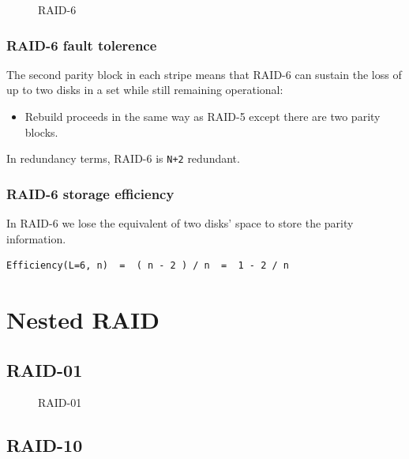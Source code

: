 \begin{figure}
\centering
\caption{RAID-6}
\end{figure}

\subsubsection{RAID-6 fault tolerence}\label{raid-6-fault-tolerence}

The second parity block in each stripe means that RAID-6 can sustain the
loss of up to two disks in a set while still remaining operational:

\begin{itemize}

\item
  Rebuild proceeds in the same way as RAID-5 except there are two parity
  blocks.
\end{itemize}

In redundancy terms, RAID-6 is \texttt{N+2} redundant.

\subsubsection{RAID-6 storage
efficiency}\label{raid-6-storage-efficiency}

In RAID-6 we lose the equivalent of two disks' space to store the parity
information.

\begin{verbatim}
Efficiency(L=6, n)  =  ( n - 2 ) / n  =  1 - 2 / n 
\end{verbatim}

\section{Nested RAID}\label{nested-raid}

\subsection{RAID-01}\label{raid-01}

\begin{figure}
\centering
\caption{RAID-01}
\end{figure}

\subsection{RAID-10}\label{raid-10}

